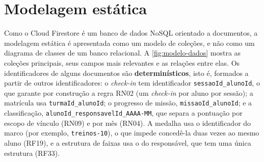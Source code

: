 \section{Modelagem estática}
\label{sec:modelagem-estatica}

Como o Cloud Firestore é um banco de dados NoSQL orientado a documentos,
a modelagem estática é apresentada como um modelo de coleções, e não como
um diagrama de classes de um banco relacional. A \autoref{fig:modelo-dados}
mostra as coleções principais, seus campos mais relevantes e as relações
entre elas. Os identificadores de alguns documentos são
\textbf{determinísticos}, isto é, formados a partir de outros
identificadores: o \textit{check-in} tem identificador
\texttt{sessaoId\_alunoId}, o que garante por construção a regra RN02
(um \textit{check-in} por aluno por sessão); a matrícula usa
\texttt{turmaId\_alunoId}; o progresso de missão,
\texttt{missaoId\_alunoId}; e a classificação,
\texttt{alunoId\_responsavelId\_AAAA-MM}, que separa a pontuação por escopo
de vínculo (RN09) e por mês (RN04). A medalha usa o identificador do
marco (por exemplo, \texttt{treinos-10}), o que impede concedê-la duas
vezes ao mesmo aluno (RF19), e a estrutura de faixas usa o do
responsável, que tem uma única estrutura (RF33).

